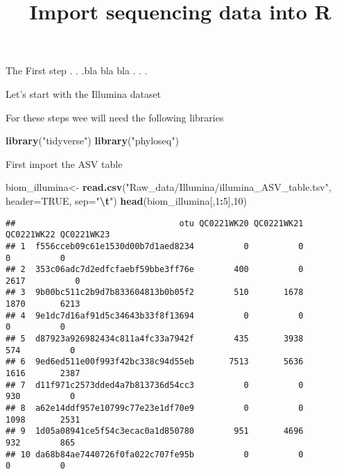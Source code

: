 \documentclass[
]{article}
\title{Import sequencing data into R}
\author{}
\date{\vspace{-2.5em}}
\newenvironment{Shaded}{\begin{snugshade}}{\end{snugshade}}
\newcommand{\AttributeTok}[1]{\textcolor[rgb]{0.13,0.29,0.53}{#1}}
\newcommand{\ConstantTok}[1]{\textcolor[rgb]{0.56,0.35,0.01}{#1}}
\newcommand{\DecValTok}[1]{\textcolor[rgb]{0.00,0.00,0.81}{#1}}
\newcommand{\FunctionTok}[1]{\textcolor[rgb]{0.13,0.29,0.53}{\textbf{#1}}}
\newcommand{\NormalTok}[1]{#1}
\newcommand{\OtherTok}[1]{\textcolor[rgb]{0.56,0.35,0.01}{#1}}
\newcommand{\SpecialCharTok}[1]{\textcolor[rgb]{0.81,0.36,0.00}{\textbf{#1}}}
\newcommand{\StringTok}[1]{\textcolor[rgb]{0.31,0.60,0.02}{#1}}
\begin{document}
\maketitle

The First step . . .bla bla bla . . .

Let's start with the Illumina dataset

For these steps wee will need the following libraries

\begin{Shaded}
\begin{Highlighting}[]
\FunctionTok{library}\NormalTok{(}\StringTok{"tidyverse"}\NormalTok{)}
\FunctionTok{library}\NormalTok{(}\StringTok{"phyloseq"}\NormalTok{)}
\end{Highlighting}
\end{Shaded}

First import the ASV table

\begin{Shaded}
\begin{Highlighting}[]
\NormalTok{biom\_illumina}\OtherTok{\textless{}{-}} \FunctionTok{read.csv}\NormalTok{(}\StringTok{"Raw\_data/Illumina/illumina\_ASV\_table.tsv"}\NormalTok{, }
                        \AttributeTok{header=}\ConstantTok{TRUE}\NormalTok{, }\AttributeTok{sep=}\StringTok{"}\SpecialCharTok{\textbackslash{}t}\StringTok{"}\NormalTok{)}
\FunctionTok{head}\NormalTok{(biom\_illumina[,}\DecValTok{1}\SpecialCharTok{:}\DecValTok{5}\NormalTok{],}\DecValTok{10}\NormalTok{)}
\end{Highlighting}
\end{Shaded}

\begin{verbatim}
##                                 otu QC0221WK20 QC0221WK21 QC0221WK22 QC0221WK23
## 1  f556cceb09c61e1530d00b7d1aed8234          0          0          0          0
## 2  353c06adc7d2edfcfaebf59bbe3ff76e        400          0       2617          0
## 3  9b00bc511c2b9d7b833604813b0b05f2        510       1678       1870       6213
## 4  9e1dc7d16af91d5c34643b33f8f13694          0          0          0          0
## 5  d87923a926982434c811a4fc33a7942f        435       3938        574          0
## 6  9ed6ed511e00f993f42bc338c94d55eb       7513       5636       1616       2387
## 7  d11f971c2573dded4a7b813736d54cc3          0          0        930          0
## 8  a62e14ddf957e10799c77e23e1df70e9          0          0       1098       2531
## 9  1d05a08941ce5f54c3ecac0a1d850780        951       4696        932        865
## 10 da68b84ae7440726f0fa022c707fe95b          0          0          0          0
\end{verbatim}
\end{document}
